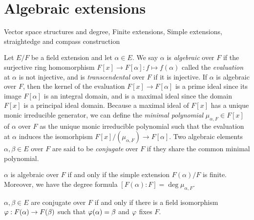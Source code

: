 \documentclass{../../large}
\begin{document}
\section{Algebraic extensions}

\begin{prb}
Vector space structures and degree,
Finite extensions,
Simple extensions,
straightedge and compass construction
\end{prb}

\begin{prb}
Let $E/F$ be a field extension and let $\alpha\in E$.
We say $\alpha$ is \emph{algebraic} over $F$ if the surjective ring homomorphism $F[x]\to F[\alpha]:f\mapsto f(\alpha)$ called the \emph{evaluation} at $\alpha$ is not injective, and is \emph{transcendental} over $F$ if it is injective.
If $\alpha$ is algebraic over $F$, then the kernel of the evaluation $F[x]\to F[\alpha]$ is a prime ideal since its image $F[\alpha]$ is an integral domain, and is a maximal ideal since the domain $F[x]$ is a principal ideal domain.
Because a maximal ideal of $F[x]$ has a unique monic irreducible generator, we can define the \emph{minimal polynomial} $\mu_{\alpha,F}\in F[x]$ of $\alpha$ over $F$ as the unique monic irreducible polynomial such that the evaluation at $\alpha$ induces the isomorhpism $F[x]/(\mu_{\alpha,F})\to F[\alpha]$.
Two algebraic elements $\alpha,\beta\in E$ over $F$ are said to be \emph{conjugate} over $F$ if they share the common minimal polynomial.
\begin{parts}
\item $\alpha$ is algebraic over $F$ if and only if the simple extension $F(\alpha)/F$ is finite. Moreover, we have the degree formula $[F(\alpha):F]=\deg\mu_{\alpha,F}$.
\item $\alpha,\beta\in E$ are conjugate over $F$ if and only if there is a field isomorphism $\varphi:F(\alpha)\to F(\beta)$ such that $\varphi(\alpha)=\beta$ and $\varphi$ fixes $F$.
\end{parts}
\end{prb}
\end{document}
